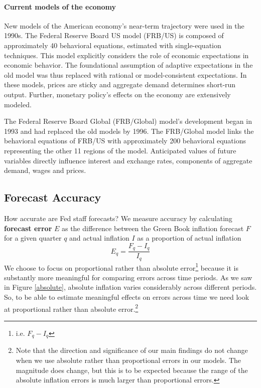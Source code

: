 \documentclass[a4paper]{article}\usepackage{graphicx, color}
\begin{document}
\paragraph{Current models of the economy}
New models of the American economy's near-term trajectory were used in the 1990s. The Federal Reserve Board US model (FRB/US) is composed of approximately 40 behavioral equations, estimated with single-equation techniques. This model explicitly considers the role of economic expectations in economic behavior. The foundational assumption of adaptive expectations in the old model was thus replaced with rational or model-consistent expectations. In these models, prices are sticky and aggregate demand determines short-run output. Further, monetary policy's effects on the economy are extensively modeled. 

The Federal Reserve Board Global (FRB/Global) model's development began in 1993 and had replaced the old models by 1996. The FRB/Global model links the behavioral equations of FRB/US with approximately 200 behavioral equations representing the other 11 regions of the model. Anticipated values of future variables directly influence interest and exchange rates, components of aggregate demand, wages and prices.

\subsection{Forecast Accuracy}\label{ForecastAcc}

How accurate are Fed staff forecasts? We measure accuracy by calculating {\bf{forecast error}} $E$ as the difference between the Green Book inflation forecast $F$ for a given quarter $q$ and actual inflation $I$ as a proportion of actual inflation
%
\begin{equation}
    E_{q} = \frac{F_{q} - I_{q}}{I_{q}}
\end{equation}
%
We choose to focus on proportional rather than absolute error\footnote{i.e. $F_{q} - I_{q}$} because it is substantly more meaningful for comparing errors across time periods. As we saw in Figure \ref{absolute}, absolute inflation varies considerably across different periods. So, to be able to estimate meaningful effects on errors across time we need look at proportional rather than absolute error.\footnote{Note that the direction and significance of our main findings do not change when we use absolute rather than proportional errors in our models. The magnitude does change, but this is to be expected because the range of the absolute inflation errors is much larger than proportional errors.}
\end{document}
